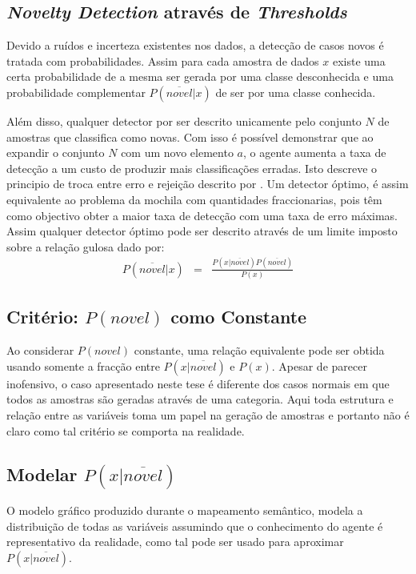 \documentclass[9pt,a4paper]{extarticle}
\begin{document}
\begin{multicols}{2}
\subsection{\emph{Novelty Detection} através de \emph{Thresholds}}
Devido a ruídos e incerteza existentes nos dados, a detecção de casos novos é tratada com
probabilidades. Assim para cada amostra de dados $x$ existe uma certa probabilidade de a mesma
ser gerada por uma classe desconhecida e uma probabilidade complementar $P(\overline{novel}|x)$
de ser por uma classe conhecida.

Além disso, qualquer detector por ser descrito unicamente pelo conjunto $N$ de amostras que classifica
como novas. Com isso é possível demonstrar que ao expandir o conjunto $N$ com um novo elemento $a$,
o agente aumenta a taxa de detecção a um custo de produzir mais classificações erradas.
Isto descreve o principio de troca entre erro e rejeição descrito por \cite{chow1970optimum}.
Um detector óptimo, é assim equivalente ao problema da mochila com quantidades fraccionarias, pois têm
como objectivo obter a maior taxa de detecção com uma taxa de erro máximas. Assim qualquer detector
óptimo pode ser descrito através de um limite imposto sobre a relação gulosa dado por:
\begin{eqnarray}
P(\overline{novel}|x) &=& \frac{P(x|\overline{novel})P(\overline{novel})}{P(x)}
\end{eqnarray}

\subsection{Critério: $P(novel)$ como Constante}
Ao considerar $P(novel)$ constante, uma relação equivalente pode ser obtida usando somente a fracção entre $P(x|\overline{novel})$ e $P(x)$.
Apesar de parecer inofensivo, o caso apresentado neste tese é diferente dos casos normais em que todos as amostras
são geradas através de uma categoria. Aqui toda estrutura e relação entre as variáveis toma um papel na geração
de amostras e portanto não é claro como tal critério se comporta na realidade.

\subsection{Modelar $P(x|\overline{novel})$}
O modelo gráfico produzido durante o mapeamento semântico, modela a distribuição de todas as variáveis
assumindo que o conhecimento do agente é representativo da realidade, como tal pode ser usado
para aproximar $P(x|\overline{novel})$.


\end{multicols}
\end{document}
